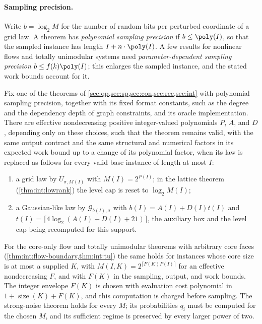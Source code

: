 \paragraph{Sampling precision.}
Write $b=\log_2M$ for the number of random bits per perturbed coordinate of a
grid law. A theorem has \emph{polynomial sampling precision} if
$b\le\poly(I)$, so that the sampled instance has length
$I+n\cdot\poly(I)$. A few results for nonlinear flows and totally
unimodular systems need \emph{parameter-dependent sampling precision}
$b\le f(k)\poly(I)$; this enlarges the sampled instance, and the stated work
bounds account for it.

\begin{proposition}\label{prop:model:uniform}
Fix one of the theorems of \cref{sec:qp,sec:sp,sec:con,sec:rec,sec:int}
with polynomial sampling precision, together with its fixed format
constants, such as the degree and the dependency depth of graph constraints,
and its oracle implementation. There are effective nondecreasing
positive integer-valued polynomials $P$, $A$, and $D$, depending only on these choices, such that the
theorem remains valid, with the same output contract and the same
structural and numerical factors in its expected work bound up to a change
of its polynomial factor, when its law is replaced as follows for every
valid base instance of length at most $I$:
\begin{enumerate}[label=(\alph*)]
\item a grid law by $U_{\sigma,M(I)}$ with $M(I)=2^{P(I)}$; in the lattice
theorem (\cref{thm:int:lowrank}) the level cap is reset to $\log_2M(I)$;
\item a Gaussian-like law by $\mathcal G_{b(I),\sigma}$ with
$b(I)=A(I)+D(I)t(I)$ and $t(I)=\lceil4\log_2(A(I)+D(I)+21)\rceil$, the
auxiliary box and the level cap being recomputed for this support.
\end{enumerate}
For the core-only flow and totally unimodular theorems with arbitrary core
faces (\cref{thm:int:flow-boundary,thm:int:tu}) the same holds for instances
whose core size is at most a supplied $K$, with $M(I,K)=2^{\lceil
F(K)P(I)\rceil}$ for an effective nondecreasing $F$, and with $F(K)$ in the
sampling, output, and work bounds. The integer envelope $F(K)$ is chosen
with evaluation cost polynomial in $1+\operatorname{size}(K)+F(K)$,
and this computation is charged before sampling. The strong-noise theorem holds for every
$M$; its probabilities $q_i$ must be computed for the chosen $M$, and its
sufficient regime is preserved by every larger power of two.
\end{proposition}

